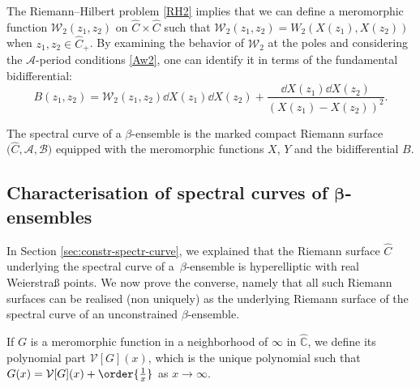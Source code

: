 \documentclass[pdftex]{sigma}
\numberwithin{equation}{section}
\newcommand{\W}{\mathcal{W}}
\newcommand{\A}{\mathcal{A}}
\begin{document}
The Riemann--Hilbert problem \eqref{RH2} implies that we can define a meromorphic
function $\W_{2}(z_1,z_2)$ on $\widehat{C} \times \widehat{C}$ such that
$\W_{2}(z_1,z_2) = W_{2}(X(z_1),X(z_2))$ when
$z_1,z_2 \in \widehat{C}_{+}$. By examining the behavior of $\W_2$ at the poles and considering the $\A$-period conditions \eqref{Aw2}, one can identify it in terms of the fundamental bidifferential:
\begin{equation}
 \label{BW2}
 B(z_1,z_2) = \W_{2}(z_1,z_2)\dd X(z_1)\dd X(z_2) + \frac{\dd X(z_1)\dd X(z_2)}{(X(z_1) - X(z_2))^{2}}.
\end{equation}

\begin{Definition}
The spectral curve of a $\beta$-ensemble is the marked compact Riemann surface $\big(\widehat{C},\mathcal{A},\mathcal{B}\big)$ equipped with the meromorphic functions $X$, $Y$ and the bidifferential $B$.
\end{Definition}

\subsection[Characterisation of spectral curves of beta-ensembles]{Characterisation of spectral curves of $\boldsymbol{\beta}$-ensembles}

In Section \ref{sec:constr-spectr-curve}, we explained that the Riemann surface $\widehat{C}$ underlying the spectral curve of \mbox{a~$\beta$-ensemble} is hyperelliptic with real Weierstra\ss{} points. We now prove the converse, namely that all such Riemann surfaces can be realised (non uniquely) as the underlying Riemann surface of the spectral curve of an unconstrained $\beta$-ensemble.

 \begin{Definition}
 If $G$ is a meromorphic function in a neighborhood of $\infty$ in $\widehat{\mathbb{C}}$, we define its polynomial part $\mathcal{V}[G](x)$, which is the unique polynomial such that $G(x) = \mathcal{V}[G](x) + \order{\frac{1}{x}}$ as $x \rightarrow \infty$.
 \end{Definition}
\end{document}
